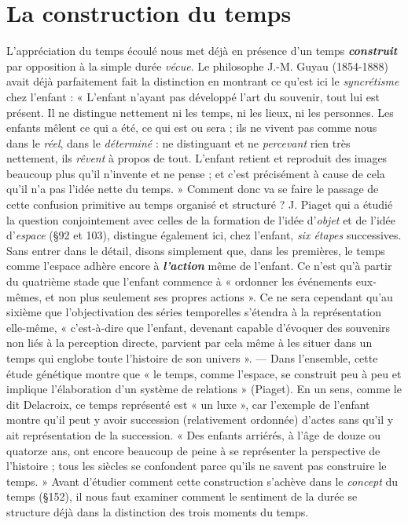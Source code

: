 \section{La construction du temps}%
L’appréciation du temps
écoulé nous met déjà en présence d’un temps \textbf{\textit {construit}} par opposition
à la simple durée {\it vécue}. Le philosophe J.-M. Guyau (1854-1888)
avait déjà parfaitement fait la distinction en montrant ce qu'est ici
le {\it syncrétisme} chez l'enfant : « L'enfant n'ayant pas développé l’art
du souvenir, tout lui est présent. Il ne distingue nettement ni les temps,
ni les lieux, ni les personnes. Les enfants mêlent ce qui a été, ce qui
est ou sera ; ils ne vivent pas comme nous dans le {\it réel}, dans le {\it déterminé} :
ne distinguant et ne {\it percevant} rien très nettement, ils {\it rêvent}
à propos de tout. L'enfant retient et reproduit des images beaucoup
plus qu’il n’invente et ne pense ; et c’est précisément à cause de cela
qu’il n’a pas l’idée nette du temps. » Comment donc va se faire le
passage de cette confusion primitive au temps organisé et structuré ?
J. Piaget qui a étudié la question conjointement avec celles de la
formation de l’idée d'{\it objet} et de l’idée d'{\it espace} (\S 92 et 103), distingue
également ici, chez l'enfant, {\it six étapes} successives. Sans entrer dans
le détail, disons simplement que, dans les premières, le temps comme
l’espace adhère encore à \textbf{\textit {l’action}} même de l’enfant. Ce n’est qu’à
partir du quatrième stade que l’enfant commence à « ordonner les
événements eux-mêmes, et non plus seulement ses propres actions ».
Ce ne sera cependant qu’au sixième que l’objectivation des séries
temporelles s’étendra à la représentation elle-même, « c’est-à-dire que
l’enfant, devenant capable d'évoquer des souvenirs non liés à la perception
directe, parvient par cela même à les situer dans un temps
qui englobe toute l’histoire de son univers ». — Dans l’ensemble,
cette étude génétique montre que « le temps, comme l’espace, se
construit peu à peu et implique l'élaboration d’un système de relations »
(Piaget). En un sens, comme le dit Delacroix, ce temps
représenté est « un luxe », car l'exemple de l’enfant montre qu'il peut
y avoir succession (relativement ordonnée) d’actes sans qu’il y ait
représentation de la succession. « Des enfants arriérés, à l’âge de
douze ou quatorze ans, ont encore beaucoup de peine à se représenter
la perspective de l’histoire ; tous les siècles se confondent parce qu’ils
ne savent pas construire le temps. » Avant d’étudier comment cette
construction s'achève dans le {\it concept} du temps (\S 152), il nous faut
examiner comment le sentiment de la durée se structure déjà dans la
distinction des trois moments du temps.

